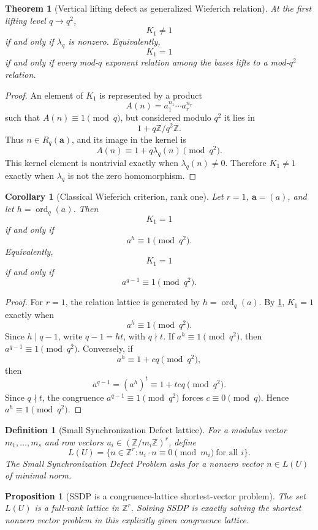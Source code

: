 \documentclass[11pt]{article}
\newtheorem{theorem}{Theorem}
\newtheorem{proposition}{Proposition}
\newtheorem{corollary}{Corollary}
\newtheorem{definition}{Definition}
\newcommand{\Z}{\mathbb Z}
\newcommand{\ord}{\operatorname{ord}}
\begin{document}
\begin{theorem}[Vertical lifting defect as generalized Wieferich relation]\label{T:wieferich-relation}
At the first lifting level \(q\to q^2\),
\[
K_1\ne1
\]
if and only if \(\lambda_q\) is nonzero.  Equivalently,
\[
K_1=1
\]
if and only if every mod-\(q\) exponent relation among the bases lifts to a mod-\(q^2\) relation.
\end{theorem}

\begin{proof}
An element of \(K_1\) is represented by a product
\[
A(n)=a_1^{n_1}\cdots a_r^{n_r}
\]
such that \(A(n)\equiv1\pmod q\), but considered modulo \(q^2\) it lies in
\[
1+q\Z/q^2\Z.
\]
Thus \(n\in R_q(\mathbf a)\), and its image in the kernel is
\[
A(n)\equiv1+q\lambda_q(n)\pmod{q^2}.
\]
This kernel element is nontrivial exactly when \(\lambda_q(n)\ne0\).  Therefore \(K_1\ne1\) exactly when \(\lambda_q\) is not the zero homomorphism.
\end{proof}

\begin{corollary}[Classical Wieferich criterion, rank one]\label{C:rank-one-wieferich}
Let \(r=1\), \(\mathbf a=(a)\), and let \(h=\ord_q(a)\).  Then
\[
K_1=1
\]
if and only if
\[
a^h\equiv1\pmod{q^2}.
\]
Equivalently,
\[
K_1=1
\]
if and only if
\[
a^{q-1}\equiv1\pmod{q^2}.
\]
\end{corollary}

\begin{proof}
For \(r=1\), the relation lattice is generated by \(h=\ord_q(a)\).  By \cref{T:wieferich-relation}, \(K_1=1\) exactly when
\[
a^h\equiv1\pmod{q^2}.
\]
Since \(h\mid q-1\), write \(q-1=ht\), with \(q\nmid t\).  If \(a^h\equiv1\pmod{q^2}\), then \(a^{q-1}\equiv1\pmod{q^2}\).  Conversely, if
\[
a^h\equiv 1+cq\pmod{q^2},
\]
then
\[
a^{q-1}=(a^h)^t\equiv1+tcq\pmod{q^2}.
\]
Since \(q\nmid t\), the congruence \(a^{q-1}\equiv1\pmod{q^2}\) forces \(c\equiv0\pmod q\).  Hence \(a^h\equiv1\pmod{q^2}\).
\end{proof}

\begin{definition}[Small Synchronization Defect lattice]\label{D:ssd-lattice}
For a modulus vector \(m_1,\ldots,m_s\) and row vectors \(u_i\in(\Z/m_i\Z)^r\), define
\[
L(U)=
\{n\in\Z^r:u_i\cdot n\equiv0\pmod{m_i}\ \text{for all }i\}.
\]
The Small Synchronization Defect Problem asks for a nonzero vector \(n\in L(U)\) of minimal norm.
\end{definition}

\begin{proposition}[SSDP is a congruence-lattice shortest-vector problem]\label{P:ssdp-svp}
The set \(L(U)\) is a full-rank lattice in \(\Z^r\).  Solving SSDP is exactly solving the shortest nonzero vector problem in this explicitly given congruence lattice.
\end{proposition}
\end{document}
